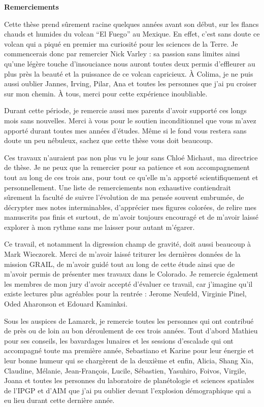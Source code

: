 \thispagestyle{plain}
\begin{flushleft}
 \Large
 \vspace{.5cm}
 \textbf{Remerciements}
\end{flushleft}

Cette thèse prend sûrement racine quelques années avant son début, sur
les flancs chauds et humides du volcan ``El Fuego'' au Mexique. En
effet, c’est sans doute ce volcan qui a piqué en premier ma curiosité
pour les sciences de la Terre. Je commencerais donc par remercier Nick
Varley : sa passion sans limites ainsi qu’une légère touche
d’insouciance nous auront toutes deux permis d’effleurer au plus près
la beauté et la puissance de ce volcan capricieux. À Colima, je ne
puis aussi oublier Jannes, Irving, Pilar, Ana et toutes les personnes
que j’ai pu croiser sur mon chemin. À tous, merci pour cette
expérience inoubliable.

Durant cette période, je remercie aussi mes parents d’avoir supporté
ces longs mois sans nouvelles. Merci à vous pour le soutien
inconditionnel que vous m’avez apporté durant toutes mes années
d’études. Même si le fond vous restera sans doute un peu nébuleux,
sachez que cette thèse vous doit beaucoup.

Ces travaux n’auraient pas non plus vu le jour sans Chloé Michaut, ma
directrice de thèse. Je ne peux que la remercier pour sa patience et
son accompagnement tout au long de ces trois ans, pour tout ce qu’elle
m’a apporté scientifiquement et personnellement. Une liste de
remerciements non exhaustive contiendrait sûrement la faculté de suivre
l’évolution de ma pensée souvent embrumée, de décrypter mes notes
interminables, d’apprécier mes figures colorées, de relire mes
manuscrits pas finis et surtout, de m’avoir toujours encouragé et de
m’avoir laissé explorer à mon rythme sans me laisser pour autant
m’égarer.

Ce travail,  et notamment la  digression champ de gravité,  doit aussi
beaucoup  à Mark  Wieczorek.   Merci de  m’avoir  laissé triturer  les
dernières données de  la mission GRAIL, de m’avoir guidé  tout au long
de cette  étude ainsi que de  m’avoir permis de présenter  mes travaux
dans  le Colorado.  Je  remercie  également les  membres  de mon  jury
d’avoir  accepté  d’évaluer ce  travail,  car  j’imagine qu’il  existe
lectures plus  agréables pour  la rentrée  : Jerome  Neufeld, Virginie
Pinel, Oded Aharonson et Edouard Kaminksi.

Sous les auspices de Lamarck, je remercie toutes les personnes qui ont
contribué de près  ou de loin au bon déroulement  de ces trois années.
Tout d’abord Mathieu pour ses conseils, les bavardages lunaires et les
sessions  d’escalade  qui  ont  accompagné toute  ma  première  année,
Sebastiano et  Karine pour leur  énergie et  leur bonne humeur  qui se
chargèrent  de la  deuxième  et enfin,  Alicia,  Shang Xia,  Claudine,
Mélanie, Jean-François, Lucile,  Sébastien, Yasuhiro, Foivos, Virgile,
Joana  et  toutes les  personnes  du  laboratoire de  planétologie  et
sciences  spatiales de  l’IPGP et  d'AIM  que j’ai  pu oublier  devant
l’explosion démographique qui a eu lieu durant cette dernière année.


